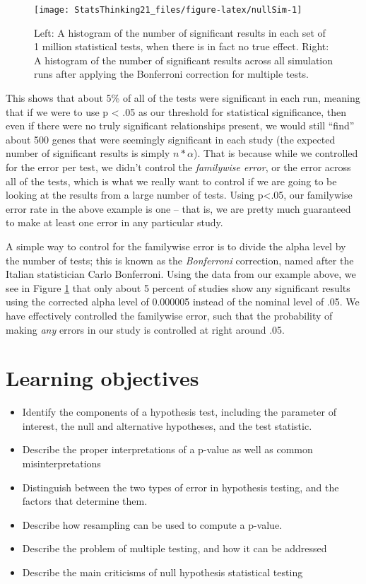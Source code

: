 \documentclass[12pt,]{book}
\providecommand{\tightlist}{%
  \setlength{\itemsep}{0pt}\setlength{\parskip}{0pt}}
\theoremstyle{definition}
\theoremstyle{definition}
\theoremstyle{definition}
\theoremstyle{remark}
\begin{document}
\begin{figure}
\texttt{[image: StatsThinking21\_files/figure-latex/nullSim-1]} \caption{Left: A histogram of the number of significant results in each set of 1 million statistical tests, when there is in fact no true effect. Right: A histogram of the number of significant results across all simulation runs after applying the Bonferroni correction for multiple tests.}\label{fig:nullSim}
\end{figure}

This shows that about 5\% of all of the tests were significant in each run, meaning that if we were to use p \textless{} .05 as our threshold for statistical significance, then even if there were no truly significant relationships present, we would still ``find'' about 500 genes that were seemingly significant in each study (the expected number of significant results is simply \(n * \alpha\)). That is because while we controlled for the error per test, we didn't control the \emph{familywise error}, or the error across all of the tests, which is what we really want to control if we are going to be looking at the results from a large number of tests. Using p\textless{}.05, our familywise error rate in the above example is one -- that is, we are pretty much guaranteed to make at least one error in any particular study.

A simple way to control for the familywise error is to divide the alpha level by the number of tests; this is known as the \emph{Bonferroni} correction, named after the Italian statistician Carlo Bonferroni. Using the data from our example above, we see in Figure \ref{fig:nullSim} that only about 5 percent of studies show any significant results using the corrected alpha level of 0.000005 instead of the nominal level of .05. We have effectively controlled the familywise error, such that the probability of making \emph{any} errors in our study is controlled at right around .05.

\hypertarget{learning-objectives-8}{%
\section{Learning objectives}\label{learning-objectives-8}}

\begin{itemize}
\tightlist
\item
  Identify the components of a hypothesis test, including the parameter of interest, the null and alternative hypotheses, and the test statistic.
\item
  Describe the proper interpretations of a p-value as well as common misinterpretations
\item
  Distinguish between the two types of error in hypothesis testing, and the factors that determine them.
\item
  Describe how resampling can be used to compute a p-value.
\item
  Describe the problem of multiple testing, and how it can be addressed
\item
  Describe the main criticisms of null hypothesis statistical testing
\end{itemize}
\end{document}

